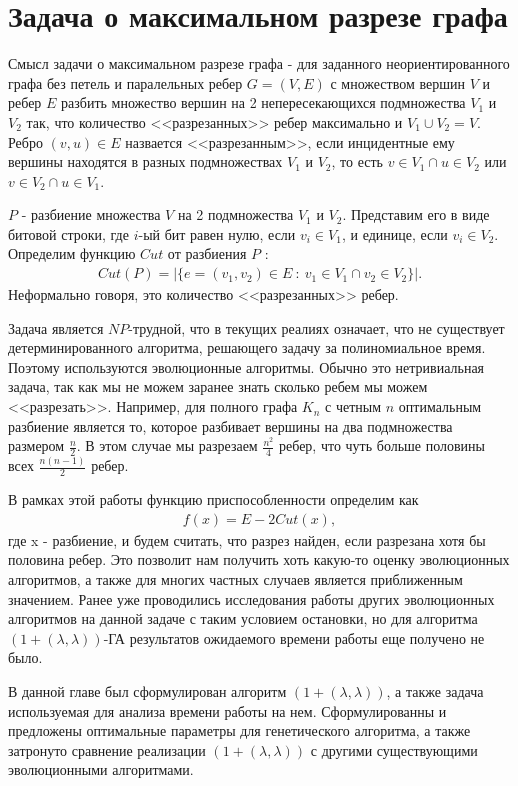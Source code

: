 \documentclass[times]{itmo-student-thesis}
\newcommand{\alglambda}{${(1 + (\lambda , \lambda))}$\xspace}
\newcommand{\alglambdaf}{${(1 + (\lambda , \lambda))}$-ГА\xspace}
\begin{document}
\section{Задача о максимальном разрезе графа}

Смысл задачи о максимальном разрезе графа - для заданного неориентированного графа без петель и паралельных ребер $G = (V, E)$ с множеством вершин $V$ и ребер $E$ разбить множество вершин на 2 непересекающихся подмножества $V_1$ и $V_2$ так, что количество <<разрезанных>> ребер максимально и $V_1 \cup V_2 = V$.
Ребро $(v, u) \in E$ назвается <<разрезанным>>, если инцидентные ему вершины находятся в разных подмножествах $V_1$ и $V_2$, то есть $v \in V_1 \cap u \in V_2$ или $v \in V_2 \cap u \in V_1$.

$P$ - разбиение множества $V$ на 2 подмножества $V_1$ и $V_2$.
Представим его в виде битовой строки, где $i$-ый бит равен нулю, если $v_i \in V_1$, и единице, если $v_i \in V_2$.
Определим функцию  $Cut$ от разбиения $P$ :
\begin{align*}
   Cut(P) = |\{e = (v_1, v_2) \in E ~:~ v_1 \in V_1 \cap v_2 \in V_2\}|.
\end{align*}
Неформально говоря, это количество <<разрезанных>> ребер.

Задача является $NP$-трудной, что в текущих реалиях означает, что не существует детерминированного алгоритма, решающего задачу за полиномиальное время. Поэтому используются эволюционные алгоритмы.
Обычно это нетривиальная задача, так как мы не можем заранее знать сколько ребем мы можем <<разрезать>>. Например, для полного графа $K_n$ с четным $n$ оптимальным разбиение является то, которое разбивает вершины на два подмножества размером $\frac{n}{2}$. В этом случае мы разрезаем $\frac{n^2}{4}$ ребер, что чуть больше половины всех $\frac{n(n-1)}{2}$ ребер.

В рамках этой работы функцию приспособленности определим как
\begin{align*}
   f(x) = E - 2Cut(x),
\end{align*}
где x - разбиение, и будем считать, что разрез найден, если разрезана хотя бы половина ребер.
Это позволит нам получить хоть какую-то оценку эволюционных алгоритмов, а также для многих частных случаев является приближенным значением. Ранее уже проводились исследования работы других эволюционных алгоритмов на данной задаче с таким условием остановки, но для алгоритма \alglambdaf результатов ожидаемого времени работы еще получено не было.

\chapterconclusion
В данной главе был сформулирован алгоритм \alglambda, а также задача используемая для анализа времени работы на нем. Сформулированны и предложены оптимальные параметры для генетического алгоритма, а также затронуто сравнение реализации \alglambda с другими существующими эволюционными алгоритмами.
\end{document}
